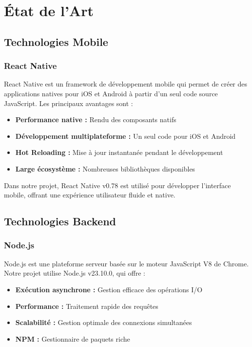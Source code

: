 \chapter{État de l'Art}

\section{Technologies Mobile}
\subsection{React Native}
React Native \cite{reactnative} est un framework de développement mobile qui permet de créer des applications natives pour iOS et Android à partir d'un seul code source JavaScript. Les principaux avantages sont :

\begin{itemize}
    \item \textbf{Performance native :} Rendu des composants natifs
    \item \textbf{Développement multiplateforme :} Un seul code pour iOS et Android
    \item \textbf{Hot Reloading :} Mise à jour instantanée pendant le développement
    \item \textbf{Large écosystème :} Nombreuses bibliothèques disponibles
\end{itemize}

Dans notre projet, React Native v0.78 est utilisé pour développer l'interface mobile, offrant une expérience utilisateur fluide et native.

\section{Technologies Backend}
\subsection{Node.js}
Node.js \cite{nodejs} est une plateforme serveur basée sur le moteur JavaScript V8 de Chrome. Notre projet utilise Node.js v23.10.0, qui offre :

\begin{itemize}
    \item \textbf{Exécution asynchrone :} Gestion efficace des opérations I/O
    \item \textbf{Performance :} Traitement rapide des requêtes
    \item \textbf{Scalabilité :} Gestion optimale des connexions simultanées
    \item \textbf{NPM :} Gestionnaire de paquets riche
\end{itemize}


